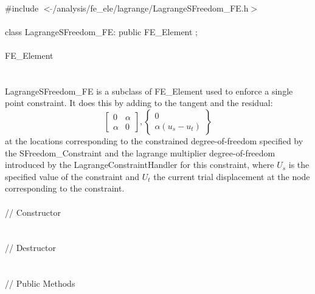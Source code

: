 
   \\
\indent \#include $<\tilde{ }$/analysis/fe\_ele/lagrange/LagrangeSFreedom\_FE.h$>$  \\

  \\
\indent class LagrangeSFreedom\_FE: public FE\_Element ;  \\

  \\
\indent FE\_Element \\
\indent{} \\ 

  \\
\indent LagrangeSFreedom\_FE is a subclass of FE\_Element used to enforce a
single point constraint. It does this by adding to the tangent and the
residual:
\[ \left[ \begin{array}{cc} 0 & \alpha \\ \alpha & 0 \end{array}
\right] ,
\left\{ \begin{array}{c} 0 \\ \alpha(u_s - u_t) \end{array} \right\} \]
\noindent at the locations
corresponding to the constrained degree-of-freedom specified by the
SFreedom\_Constraint and the lagrange multiplier degree-of-freedom
introduced by the LagrangeConstraintHandler for this constraint, where
$U_s$ is the specified value of the constraint 
and $U_t$ the current trial displacement at the node corresponding to
the constraint.\\

  \\
\indent\indent // Constructor  \\
\indent{} \\ \\
\indent\indent // Destructor  \\
\indent{}  \\ \\
\indent\indent // Public Methods \\
\indent{} \\  
\indent{} \\  
\indent{} \\  
\indent{}\\

